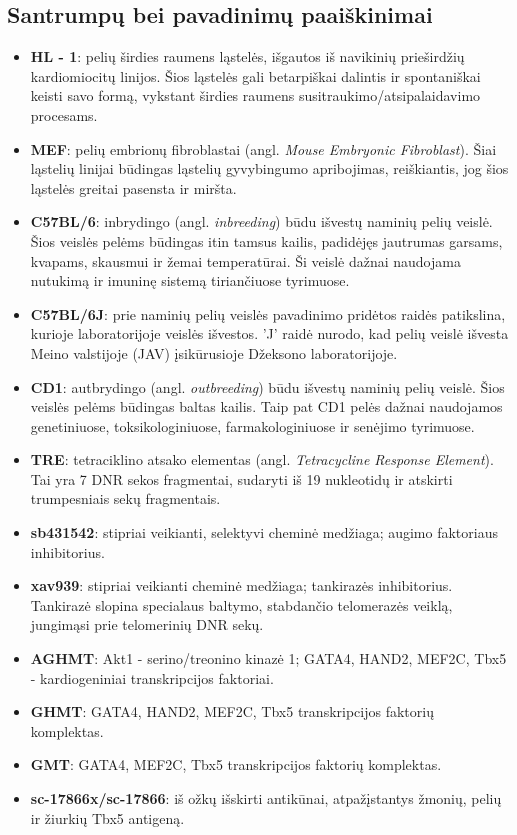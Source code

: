 \documentclass[12pt]{article}
\begin{document}
\newpage

\subsection{Santrumpų bei pavadinimų paaiškinimai}
\begin{itemize}
    \item \textbf{HL - 1}: pelių širdies raumens ląstelės, išgautos iš
        navikinių prieširdžių kardiomiocitų linijos. Šios ląstelės gali
        betarpiškai dalintis ir spontaniškai keisti savo formą, vykstant
        širdies raumens susitraukimo/atsipalaidavimo procesams.
    \item \textbf{MEF}: pelių embrionų fibroblastai (angl. \emph{Mouse
        Embryonic Fibroblast}). Šiai ląstelių linijai būdingas ląstelių
        gyvybingumo apribojimas, reiškiantis, jog šios ląstelės greitai
        pasensta ir miršta.
    \item \textbf{C57BL/6}: inbrydingo (angl. \emph{inbreeding}) būdu išvestų
        naminių pelių veislė. Šios veislės pelėms būdingas itin tamsus
        kailis, padidėjęs jautrumas garsams, kvapams, skausmui ir žemai
        temperatūrai. Ši veislė dažnai naudojama nutukimą ir imuninę sistemą
        tiriančiuose tyrimuose.
    \item \textbf{C57BL/6J}: prie naminių pelių veislės pavadinimo pridėtos
        raidės patikslina, kurioje laboratorijoje veislės išvestos. 'J' raidė
        nurodo, kad pelių veislė išvesta Meino valstijoje (JAV) įsikūrusioje
        Džeksono laboratorijoje\cite{JCKSLAB}.
    \item \textbf{CD1}: autbrydingo (angl. \emph{outbreeding}) būdu išvestų
        naminių pelių veislė. Šios veislės pelėms būdingas baltas kailis.
        Taip pat CD1 pelės dažnai naudojamos genetiniuose, toksikologiniuose,
        farmakologiniuose ir senėjimo tyrimuose.
    \item \textbf{TRE}: tetraciklino atsako elementas (angl. \emph{Tetracycline
        Response Element}). Tai yra 7 DNR sekos fragmentai,
        sudaryti iš 19 nukleotidų ir atskirti trumpesniais sekų fragmentais.
    \item \textbf{sb431542}: stipriai veikianti, selektyvi cheminė medžiaga;
        augimo faktoriaus inhibitorius.
    \item \textbf{xav939}: stipriai veikianti cheminė medžiaga; tankirazės
        inhibitorius. Tankirazė slopina specialaus baltymo, stabdančio
        telomerazės veiklą, jungimąsi prie telomerinių DNR sekų.
    \item \textbf{AGHMT}: Akt1 - serino/treonino kinazė 1; GATA4, HAND2, MEF2C,
        Tbx5 - kardiogeniniai transkripcijos faktoriai.
    \item \textbf{GHMT}: GATA4, HAND2, MEF2C, Tbx5 transkripcijos faktorių
        komplektas.
    \item \textbf{GMT}: GATA4, MEF2C, Tbx5 transkripcijos faktorių komplektas.
    \item \textbf{sc-17866x/sc-17866}: iš ožkų išskirti antikūnai,
        atpažįstantys žmonių, pelių ir žiurkių Tbx5 antigeną.
\end{itemize}
\end{document}
